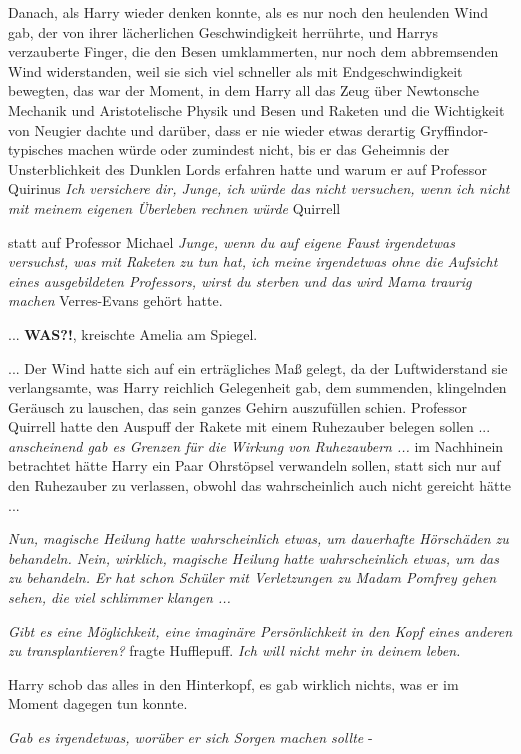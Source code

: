 Danach, als Harry wieder denken konnte, als es nur noch den heulenden Wind gab,
der von ihrer lächerlichen Geschwindigkeit herrührte, und Harrys verzauberte
Finger, die den Besen umklammerten, nur noch dem abbremsenden Wind widerstanden,
weil sie sich viel schneller als mit Endgeschwindigkeit bewegten, das war der
Moment, in dem Harry all das Zeug über Newtonsche Mechanik und Aristotelische
Physik und Besen und Raketen und die Wichtigkeit von Neugier dachte und darüber,
dass er nie wieder etwas derartig Gryffindor-typisches machen würde oder
zumindest nicht, bis er das Geheimnis der Unsterblichkeit des Dunklen Lords
erfahren hatte und warum er auf Professor Quirinus \glqq{}\emph{Ich versichere
dir, Junge, ich würde das nicht versuchen, wenn ich nicht mit meinem eigenen
Überleben rechnen würde}\grqq{} Quirrell

statt auf Professor Michael \glqq{}\emph{Junge, wenn du auf eigene Faust
irgendetwas versuchst, was mit Raketen zu tun hat, ich meine irgendetwas ohne
die Aufsicht eines ausgebildeten Professors, wirst du sterben und das wird Mama
traurig machen}\grqq{} Verres-Evans gehört hatte.

... \glqq{}\textbf{WAS?!}\grqq{}, kreischte Amelia am Spiegel.

... Der Wind hatte sich auf ein erträgliches Maß gelegt, da der Luftwiderstand
sie verlangsamte, was Harry reichlich Gelegenheit gab, dem summenden,
klingelnden Geräusch zu lauschen, das sein ganzes Gehirn auszufüllen schien.
Professor Quirrell hatte den Auspuff der Rakete mit einem Ruhezauber belegen
sollen ...
\emph{anscheinend gab es Grenzen für die Wirkung von Ruhezaubern ...}
im Nachhinein betrachtet hätte Harry ein Paar Ohrstöpsel verwandeln sollen,
statt sich nur auf den Ruhezauber zu verlassen, obwohl das wahrscheinlich auch
nicht gereicht hätte ...

\emph{Nun, magische Heilung hatte wahrscheinlich etwas, um dauerhafte Hörschäden
zu behandeln. Nein, wirklich, magische Heilung hatte wahrscheinlich etwas, um
das zu behandeln. Er hat schon Schüler mit Verletzungen zu Madam Pomfrey gehen
sehen, die viel schlimmer klangen ...}

\emph{Gibt es eine Möglichkeit, eine imaginäre Persönlichkeit in den Kopf eines
anderen zu transplantieren?} fragte Hufflepuff. \emph{Ich will nicht mehr in
deinem leben.}

Harry schob das alles in den Hinterkopf, es gab wirklich nichts, was er im
Moment dagegen tun konnte.

\emph{Gab es irgendetwas, worüber er sich Sorgen machen sollte} -

